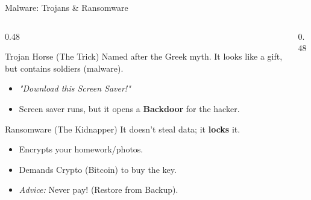\documentclass[aspectratio=169]{beamer}  %
\begin{document}
\begin{frame}{Malware: Trojans \& Ransomware}
    \begin{columns}[T]
        \begin{column}{0.48\textwidth}
            \begin{block}{Trojan Horse (The Trick)}
                \footnotesize
                Named after the Greek myth. It looks like a gift, but contains soldiers (malware).
                \begin{itemize}
                    \item \textit{"Download this Screen Saver!"}
                    \item Screen saver runs, but it opens a \textbf{Backdoor} for the hacker.
                \end{itemize}
            \end{block}
            \begin{alertblock}{Ransomware (The Kidnapper)}
                \footnotesize
                It doesn't steal data; it \textbf{locks} it.
                \begin{itemize}
                    \item Encrypts your homework/photos.
                    \item Demands Crypto (Bitcoin) to buy the key.
                    \item \textit{Advice:} Never pay! (Restore from Backup).
                \end{itemize}
            \end{alertblock}
        \end{column}
        \begin{column}{0.48\textwidth}
            \begin{center}
            \end{center}
        \end{column}
    \end{columns}
\end{frame}
\end{document}
